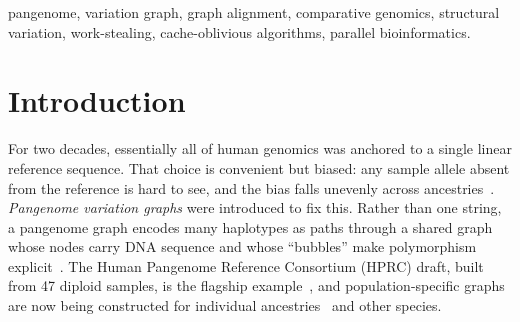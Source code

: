 \documentclass[conference]{IEEEtran}
\theoremstyle{plain}
\theoremstyle{definition}
\newcommand{\PH}[1]{\textcolor{red!75!black}{#1}}
\begin{document}
\begin{abstract}
($9.7{\times}10^{8}$ nodes, ${\sim}2.6\times$ the human genome), diffed exactly
in 72\,min; on population pangenomes the delta graph surfaces the
population-specific structural variation that a sequence-to-reference
pipeline cannot express without a linear projection.
Ablations confirm each design choice earns its place: disabling exact LAPJV
matching, the minimiser index, or work-stealing slows the affected phase by
\PH{$70\times$}, \PH{$1700\times$}, and \PH{$1.9\times$} at treatment scale while
leaving a matched control unchanged. On real African vs.\ East Asian pangenomes
(1000 Genomes, chromosome~22) the delta graph is significantly enriched near
gnomAD-SV structural variants ($1.46\times$) and pathogenic ClinVar sites
($1.61\times$, both $p<10^{-3}$ against a permutation null), locating the
graph-to-graph delta on real structural and clinical variation.
\end{abstract}

\begin{IEEEkeywords}
pangenome, variation graph, graph alignment, comparative genomics, structural
variation, work-stealing, cache-oblivious algorithms, parallel bioinformatics.
\end{IEEEkeywords}


\section{Introduction}
For two decades, essentially all of human genomics was anchored to a single
linear reference sequence. That choice is convenient but biased: any sample
allele absent from the reference is hard to see, and the bias falls unevenly
across ancestries~\cite{eizenga2020pangenome}. \emph{Pangenome variation
graphs} were introduced to fix this. Rather than one string, a pangenome graph
encodes many haplotypes as paths through a shared graph whose nodes carry DNA
sequence and whose ``bubbles'' make polymorphism explicit~\cite{garrison2018vg,
eizenga2020pangenome}. The Human Pangenome Reference Consortium (HPRC) draft,
built from 47 diploid samples, is the flagship
example~\cite{hprc2023}, and population-specific graphs are now being
constructed for individual ancestries~\cite{li2024minigraph} and other species.
\end{document}
